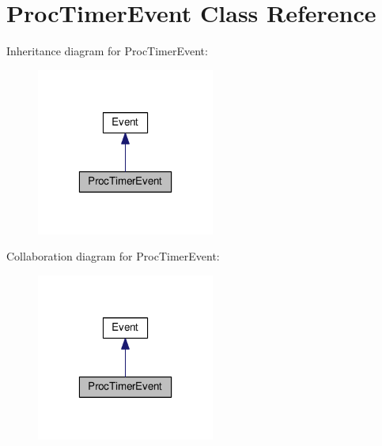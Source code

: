 \hypertarget{classProcTimerEvent}{}\section{Proc\+Timer\+Event Class Reference}
\label{classProcTimerEvent}


Inheritance diagram for Proc\+Timer\+Event\+:
\nopagebreak
\begin{figure}[H]
\begin{center}
\leavevmode
\includegraphics[width=166pt]{classProcTimerEvent__inherit__graph}
\end{center}
\end{figure}


Collaboration diagram for Proc\+Timer\+Event\+:
\nopagebreak
\begin{figure}[H]
\begin{center}
\leavevmode
\includegraphics[width=166pt]{classProcTimerEvent__coll__graph}
\end{center}
\end{figure}
